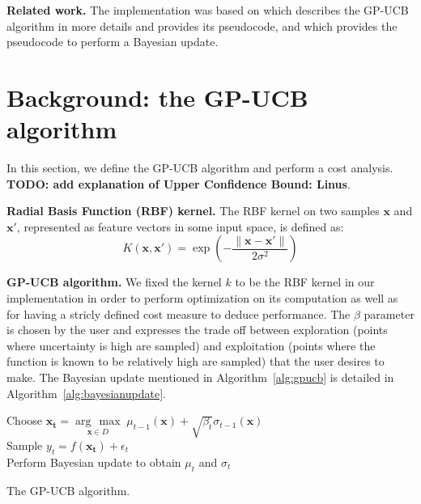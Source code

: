 \documentclass[letterpaper]{article}
\newcommand{\argmax}[1]{\underset{#1}{\operatorname{arg}\,\operatorname{max}}\;}
\newcommand{\mypar}[1]{{\bf #1.}}
\begin{document}
\mypar{Related work} The implementation was based on \cite{Krause:09} which describes the GP-UCB algorithm in more details and provides its pseudocode, and \cite{rasmussen2006gaussian} which provides the pseudocode to perform a Bayesian update.

\section{Background: the GP-UCB algorithm}\label{sec:background}

In this section, we define the GP-UCB algorithm and perform a cost analysis. \textbf{TODO: add explanation of Upper Confidence Bound: Linus}.

\mypar{Radial Basis Function (RBF) kernel}
The RBF kernel on two samples $\mathbf{x}$ and $\mathbf{x'}$, represented as feature vectors in some input space, is defined as:
\begin{equation*}
    K(\mathbf{x}, \mathbf{x'}) = \exp\left(-\frac{\lVert \mathbf{x} - \mathbf{x'} \rVert}{2\sigma^2}\right)
\end{equation*}

\mypar{GP-UCB algorithm}
We fixed the kernel $k$ to be the RBF kernel in our implementation in order to perform optimization on its computation as well as for having a stricly defined cost measure to deduce performance. The $\beta$ parameter is chosen by the user and expresses the trade off between exploration (points where uncertainty is high are sampled) and exploitation (points where the function is known to be relatively high are sampled) that the user desires to make. The Bayesian update mentioned in Algorithm~\ref{alg:gpucb} is detailed in Algorithm~\ref{alg:bayesianupdate}.
\begin{algorithm}
    \label{alg:gpucb}
        {
            Choose $\mathbf{x_t} = \argmax{\mathbf{x}\in D} \mu_{t-1}(\mathbf{x}) + \sqrt{\beta_t}\sigma_{t-1}(\mathbf{x})$\\
            Sample $y_t=f(\mathbf{x_t}) + \epsilon_t$\\
            Perform Bayesian update to obtain $\mu_t$ and $\sigma_t$
        }
    \caption{The GP-UCB algorithm. \cite{Krause:09}}
\end{algorithm}
\end{document}
